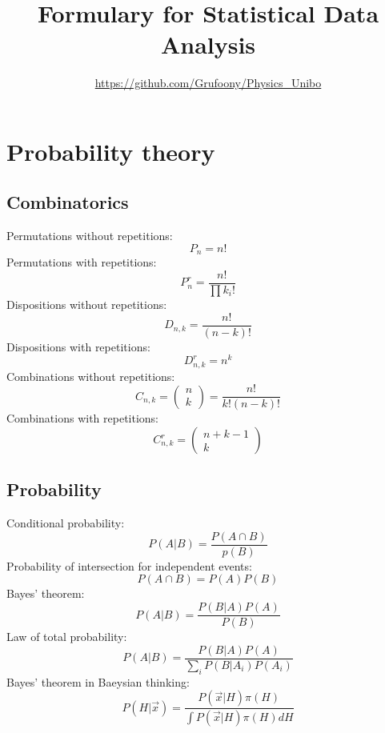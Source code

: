 \documentclass[12pt]{book}
\title{Formulary for Statistical Data Analysis} \author{\url{https://github.com/Grufoony/Physics_Unibo}}
\date{}
\newcommand{\vx}{\vec{x}}
\begin{document}
\maketitle
\tableofcontents
\pagebreak


\chapter{Probability theory}
\section{Combinatorics}
Permutations without repetitions:
\begin{equation}
	P_{n} = n!
\end{equation}
Permutations with repetitions:
\begin{equation}
	P^r_{n} = \frac{n!}{\prod k_i!}
\end{equation}
Dispositions without repetitions:
\begin{equation}
	D_{n,k} = \frac{n!}{(n-k)!}
\end{equation}
Dispositions with repetitions:
\begin{equation}
	D^r_{n,k} = n^k
\end{equation}
Combinations without repetitions:
\begin{equation}
	C_{n,k} = \begin{pmatrix}
		n \\
		k
	\end{pmatrix} = \frac{n!}{k!(n-k)!}
\end{equation}
Combinations with repetitions:
\begin{equation}
	C^r_{n,k} = \begin{pmatrix}
		n+k-1 \\
		k
	\end{pmatrix}
\end{equation}
\section{Probability}
Conditional probability:
\begin{equation}
	P(A|B) = \frac{P(A\cap B)}{p(B)}
\end{equation}
Probability of intersection for independent events:
\begin{equation}
	P(A\cap B) = P(A)P(B)
\end{equation}
Bayes' theorem:
\begin{equation}
	P(A|B) = \frac{P(B|A)P(A)}{P(B)}
\end{equation}
Law of total probability:
\begin{equation}
	P(A|B) = \frac{P(B|A)P(A)}{\sum_i P(B|A_i)P(A_i)}
\end{equation}
Bayes' theorem in Baeysian thinking:
\begin{equation}
	P(H|\vx) = \frac{P(\vx|H)\pi(H)}{\int P(\vx|H)\pi(H)dH}
\end{equation}
\end{document}
